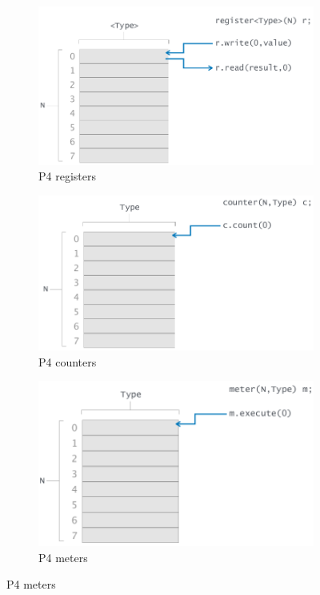 \documentclass[11pt,oneside,a4paper]{article}
\begin{document}
\begin{figure}[t!]
	\centering
	\begin{subfigure}[t]{.33\textwidth}
		\centering
		\includegraphics[width=1\textwidth,scale=1]{figures/registers}
		\caption{P4 registers \cite{advnet}}
		\label{fig:registers}
	\end{subfigure}%
	\begin{subfigure}[t]{.33\textwidth}
		\centering
		\includegraphics[width=1\textwidth,scale=1]{figures/counters}
		\caption{P4 counters \cite{advnet}}
		\label{fig:counters}
	\end{subfigure}
	\begin{subfigure}[t]{.33\textwidth}
		\centering
		\includegraphics[width=1\textwidth,scale=1]{figures/meters}
		\caption{P4 meters \cite{advnet}}
		\label{fig:meters}
	\end{subfigure}
\end{figure}
\end{document}
